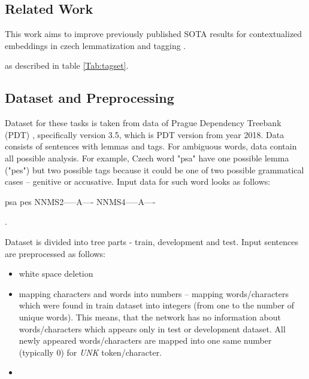 \subsection{Related Work}
This work aims to improve previously published SOTA results for contextualized embeddings in czech lemmatization and tagging \citep{Straka2019}. 

as described in table \ref{Tab:tagset}.  %



\subsection{Dataset and Preprocessing}
\label{sub:dataset}
Dataset for these tasks is taken from data of Prague Dependency Treebank (PDT) \citep{PDT35}, specifically version 3.5, which is PDT version from year 2018. %
Data consists of sentences with lemmas and tags. For ambiguous words, data contain all possible analysis. For example, Czech word "psa" have one possible lemma ("pes") but two possible tags because it could be one of two possible grammatical cases -- genitive or accusative. Input data for such word looks as follows: \\
\begin{center}
psa pes NNMS2-----A---- NNMS4-----A----
\end{center}.

Dataset is divided into tree parts - train, development and test. Input sentences are preprocessed as follows: %
\begin{itemize}
\item white space deletion
\item mapping characters and words into numbers --  mapping  words/characters which were found in train dataset into integers (from one to the number of unique words). This means, that the network has no information about words/characters which appears only in test or development dataset. All newly appeared words/characters are mapped into one same number (typically $0$) for \textit{UNK} token/character. 
\item 
\end{itemize}


